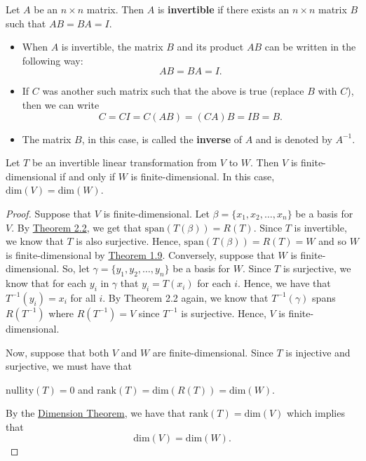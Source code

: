\begin{definition}
   Let \( A  \) be an \( n \times n  \) matrix. Then \( A  \) is \textbf{invertible} if there exists an \( n \times n  \) matrix \( B  \) such that \( AB = BA = I  \).
\end{definition}

\begin{itemize}
    \item When \( A  \) is invertible, the matrix \( B  \) and its product \( AB  \) can be written in the following way:
        \[  AB = BA = I. \]
    \item If \( C  \) was another such matrix such that the above is true (replace \( B  \) with \( C  \)), then we can write 
        \[  C = CI = C(AB) = (CA)B = IB = B.   \]
    \item The matrix \( B  \), in this case, is called the \textbf{inverse} of \( A  \) and is denoted by \( A^{-1} \). 
\end{itemize}

\begin{lemma}\label{Invertibility Implies dim V = dim W}
   Let \( T \) be an invertible linear transformation from \( V  \) to \( W  \). Then \( V  \) is finite-dimensional if and only if \( W  \) is finite-dimensional. In this case, \( \text{dim}(V ) = \text{dim}(W) \). 
\end{lemma}
\begin{proof}
    Suppose that \( V  \) is finite-dimensional. Let \( \beta = \{  {x}_{1}, {x}_{2}, \dots, {x}_{n} \}  \) be a basis for \( V  \). By {\hyperref[Spanning set for R(T)]{Theorem 2.2}}, we get that \( \text{span}(T(\beta)) = R(T) \). Since \( T  \) is invertible, we know that \( T  \) is also surjective. Hence, \( \text{span}(T(\beta)) = R(T) = W  \) and so \( W  \) is finite-dimensional by {\hyperref[Theorem 1.9]{Theorem 1.9}}. Conversely, suppose that \( W  \) is finite-dimensional. So, let \( \gamma = \{ {y}_{1}, {y}_{2}, \dots, {y}_{n} \}   \) be a basis for \( W  \). Since \( T  \) is surjective, we know that for each \( {y}_{i} \) in \( \gamma \) that \( {y}_{i} = T({x}_{i}) \) for each \( i  \). Hence, we have that \( T^{-1}({y}_{i}) = {x}_{i} \) for all \( i \). By Theorem 2.2 again, we know that \( T^{-1}(\gamma) \) spans \( R(T^{-1}) \) where \( R(T^{-1}) = V  \) since \( T^{-1}  \) is surjective. Hence, \( V  \) is finite-dimensional.
    
    Now, suppose that both \( V  \) and \( W  \) are finite-dimensional. Since \( T  \) is injective and surjective, we must have that
    \begin{center}
        \( \text{nullity}(T) = 0  \) and \( \text{rank}(T) = \text{dim}(R(T)) = \text{dim}(W) \).
    \end{center}
    By the {\hyperref[Dimension Theorem]{Dimension Theorem}}, we have that \( \text{rank}(T) = \text{dim}(V) \) which implies that 
    \[  \text{dim}(V) = \text{dim}(W). \]
\end{proof}

